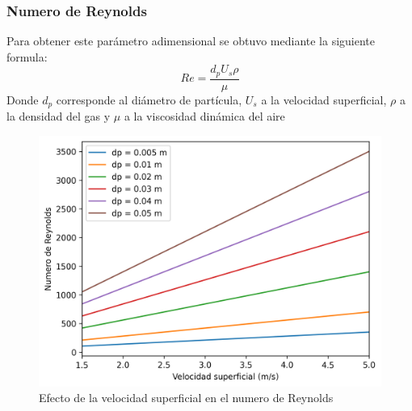 \documentclass[12pt,letterpaper,final]{article}%
\begin{document}
\subsubsection{Numero de Reynolds}
Para obtener este parámetro adimensional se obtuvo mediante la siguiente formula:
\begin{equation}\label{Ecu_reynolds}
	Re = \frac{d_p U_s \rho}{\mu}
\end{equation}
Donde $d_p$ corresponde al diámetro de partícula, $U_s$ a la velocidad superficial, $\rho$ a la densidad del gas y $\mu$ a la viscosidad dinámica del aire
\begin{figure}[ht!]\label{Reynolds_vs_Us}
	\centering
	\includegraphics[scale=.9]{RevsUs.png}
	\caption{Efecto de la velocidad superficial en el numero de Reynolds}
\end{figure} 
\end{document}
